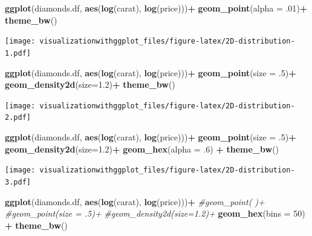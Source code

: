 \documentclass[]{krantz}
\makeatletter
\newenvironment{Shaded}{\begin{snugshade}}{\end{snugshade}}
\newcommand{\CommentTok}[1]{\textcolor[rgb]{0.56,0.35,0.01}{\textit{#1}}}
\newcommand{\DataTypeTok}[1]{\textcolor[rgb]{0.13,0.29,0.53}{#1}}
\newcommand{\DecValTok}[1]{\textcolor[rgb]{0.00,0.00,0.81}{#1}}
\newcommand{\FloatTok}[1]{\textcolor[rgb]{0.00,0.00,0.81}{#1}}
\newcommand{\KeywordTok}[1]{\textcolor[rgb]{0.13,0.29,0.53}{\textbf{#1}}}
\newcommand{\NormalTok}[1]{#1}
\newcommand{\OperatorTok}[1]{\textcolor[rgb]{0.81,0.36,0.00}{\textbf{#1}}}
\newcommand{\StringTok}[1]{\textcolor[rgb]{0.31,0.60,0.02}{#1}}
\newenvironment{kframe}{%
\medskip{}
\setlength{\fboxsep}{.8em}
 \def\at@end@of@kframe{}%
 \ifinner\ifhmode%
  \def\at@end@of@kframe{\end{minipage}}%
  \begin{minipage}{\columnwidth}%
 \fi\fi%
 \def\FrameCommand##1{\hskip\@totalleftmargin \hskip-\fboxsep
 \colorbox{shadecolor}{##1}\hskip-\fboxsep
     \hskip-\linewidth \hskip-\@totalleftmargin \hskip\columnwidth}%
 \MakeFramed {\advance\hsize-\width
   \@totalleftmargin\z@ \linewidth\hsize
   \@setminipage}}%
 {\par\unskip\endMakeFramed%
 \at@end@of@kframe}
\renewenvironment{Shaded}{\begin{kframe}}{\end{kframe}}
\makeatother
\begin{document}
\begin{Shaded}
\begin{Highlighting}[]
\KeywordTok{ggplot}\NormalTok{(diamonds.df, }\KeywordTok{aes}\NormalTok{(}\KeywordTok{log}\NormalTok{(carat), }\KeywordTok{log}\NormalTok{(price)))}\OperatorTok{+}
\StringTok{  }\KeywordTok{geom_point}\NormalTok{(}\DataTypeTok{alpha =} \FloatTok{.01}\NormalTok{)}\OperatorTok{+}\StringTok{ }
\StringTok{  }\KeywordTok{theme_bw}\NormalTok{()}
\end{Highlighting}
\end{Shaded}

\texttt{[image: visualizationwithggplot\_files/figure-latex/2D-distribution-1.pdf]}

\begin{Shaded}
\begin{Highlighting}[]
\KeywordTok{ggplot}\NormalTok{(diamonds.df, }\KeywordTok{aes}\NormalTok{(}\KeywordTok{log}\NormalTok{(carat), }\KeywordTok{log}\NormalTok{(price)))}\OperatorTok{+}
\StringTok{  }\KeywordTok{geom_point}\NormalTok{(}\DataTypeTok{size =} \FloatTok{.5}\NormalTok{)}\OperatorTok{+}\StringTok{ }
\StringTok{  }\KeywordTok{geom_density2d}\NormalTok{(}\DataTypeTok{size=}\FloatTok{1.2}\NormalTok{)}\OperatorTok{+}
\StringTok{  }\KeywordTok{theme_bw}\NormalTok{()}
\end{Highlighting}
\end{Shaded}

\texttt{[image: visualizationwithggplot\_files/figure-latex/2D-distribution-2.pdf]}

\begin{Shaded}
\begin{Highlighting}[]
\KeywordTok{ggplot}\NormalTok{(diamonds.df, }\KeywordTok{aes}\NormalTok{(}\KeywordTok{log}\NormalTok{(carat), }\KeywordTok{log}\NormalTok{(price)))}\OperatorTok{+}
\StringTok{  }\KeywordTok{geom_point}\NormalTok{(}\DataTypeTok{size =} \FloatTok{.5}\NormalTok{)}\OperatorTok{+}\StringTok{ }
\StringTok{  }\KeywordTok{geom_density2d}\NormalTok{(}\DataTypeTok{size=}\FloatTok{1.2}\NormalTok{)}\OperatorTok{+}
\StringTok{  }\KeywordTok{geom_hex}\NormalTok{(}\DataTypeTok{alpha =} \FloatTok{.6}\NormalTok{) }\OperatorTok{+}
\StringTok{  }\KeywordTok{theme_bw}\NormalTok{()}
\end{Highlighting}
\end{Shaded}

\texttt{[image: visualizationwithggplot\_files/figure-latex/2D-distribution-3.pdf]}

\begin{Shaded}
\begin{Highlighting}[]
\KeywordTok{ggplot}\NormalTok{(diamonds.df, }\KeywordTok{aes}\NormalTok{(}\KeywordTok{log}\NormalTok{(carat), }\KeywordTok{log}\NormalTok{(price)))}\OperatorTok{+}
\StringTok{  }\CommentTok{#geom_point( )+}
\StringTok{  }\CommentTok{#geom_point(size = .5)+ }
\StringTok{  }\CommentTok{#geom_density2d(size=1.2)+}
\StringTok{  }\KeywordTok{geom_hex}\NormalTok{(}\DataTypeTok{bins =} \DecValTok{50}\NormalTok{) }\OperatorTok{+}
\StringTok{  }\KeywordTok{theme_bw}\NormalTok{()}
\end{Highlighting}
\end{Shaded}
\end{document}

